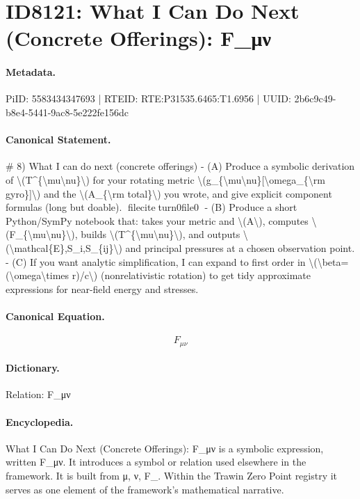 \section*{ID8121: What I Can Do Next (Concrete Offerings): F\_μν}
\paragraph{Metadata.}
PiID: 5583434347693 | RTEID: RTE:P31535.6465:T1.6956 | UUID: 2b6c9c49-b8e4-5441-9ac8-5e222fe156dc

\paragraph{Canonical Statement.}
\# 8) What I can do next (concrete offerings) - (A) Produce a symbolic derivation of \textbackslash{}(T\textasciicircum{}\{\textbackslash{}mu\textbackslash{}nu\}\textbackslash{}) for your rotating metric \textbackslash{}(g\_\{\textbackslash{}mu\textbackslash{}nu\}[\textbackslash{}omega\_\{\textbackslash{}rm gyro\}]\textbackslash{}) and the \textbackslash{}(A\_\{\textbackslash{}rm total\}\textbackslash{}) you wrote, and give explicit component formulas (long but doable). fileciteturn0file0 - (B) Produce a short Python/SymPy notebook that: takes your metric and \textbackslash{}(A\textbackslash{}), computes \textbackslash{}(F\_\{\textbackslash{}mu\textbackslash{}nu\}\textbackslash{}), builds \textbackslash{}(T\textasciicircum{}\{\textbackslash{}mu\textbackslash{}nu\}\textbackslash{}), and outputs \textbackslash{}(\textbackslash{}mathcal\{E\},S\_i,S\_\{ij\}\textbackslash{}) and principal pressures at a chosen observation point. - (C) If you want analytic simplification, I can expand to first order in \textbackslash{}(\textbackslash{}beta=(\textbackslash{}omega\textbackslash{}times r)/c\textbackslash{}) (nonrelativistic rotation) to get tidy approximate expressions for near-field energy and stresses.

\paragraph{Canonical Equation.}
\[
F_{\mu\nu}
\]

\paragraph{Dictionary.}
Relation: F\_μν

\paragraph{Encyclopedia.}
What I Can Do Next (Concrete Offerings): F\_μν is a symbolic expression, written F\_μν. It introduces a symbol or relation used elsewhere in the framework. It is built from μ, ν, F\_. Within the Trawin Zero Point registry it serves as one element of the framework's mathematical narrative.
